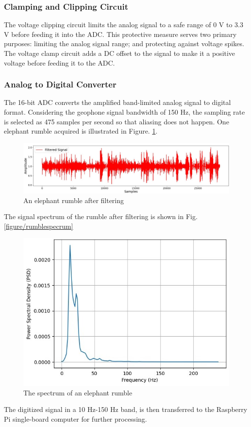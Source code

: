 \documentclass[applsci,article,accept,moreauthors,pdftex]{Definitions/mdpi}
\begin{document}
\subsubsection{Clamping and Clipping Circuit}
The voltage clipping circuit limits the analog signal to a safe range of 0 V to 3.3 V before feeding it into the ADC. This protective measure serves two primary purposes: limiting the analog signal range; and protecting against voltage spikes. The voltage clamp circuit adds a DC offset to the signal to make it a positive voltage before feeding it to the ADC.

\subsubsection{Analog to Digital Converter}
The 16-bit ADC converts the amplified band-limited analog signal to digital format. Considering the geophone signal bandwidth of 150 Hz, the sampling rate is selected as 475 samples per second so that aliasing does not happen. One elephant rumble acquired is illustrated in Figure. \ref{fig_rumblefiltered}.
\begin{figure}[t]
	\centering   \includegraphics[width=1\columnwidth]{figures/rumblefiltered}
	\caption{An elephant rumble after filtering}
	\label{fig_rumblefiltered}
\end{figure}
The signal spectrum of the rumble after filtering is shown in Fig.\ref{figure/rumblespecrum}
\begin{figure}[h]
	\centering   \includegraphics[width=0.7\columnwidth]{figures/rumblespectrum}
	\caption{The spectrum of an elephant rumble}
	\label{fig_rumblespectrum}
\end{figure}
The digitized signal in a 10 Hz-150 Hz band, is then transferred to the Raspberry Pi single-board computer for further processing. 
\end{document}
